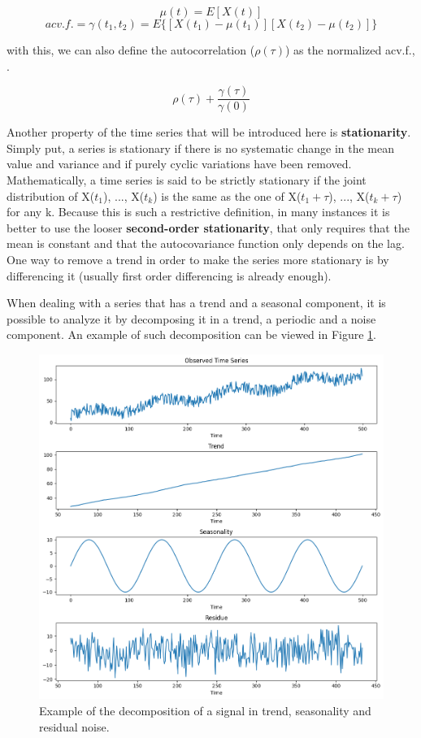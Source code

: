 \documentclass[../main.tex]{subfiles}
\begin{document}
            $$\mu(t) = E[X(t)]$$
            $$acv.f. = \gamma (t_1,t_2) = E\{[X(t_1)-\mu(t_1)][X(t_2)-\mu(t_2)]\}$$

        with this, we can also define the autocorrelation ($\rho(\tau)$) as the normalized acv.f., .

            $$\rho(\tau) + \frac{\gamma(\tau)}{\gamma (0)}$$

        Another property of the time series that will be introduced here is \textbf{stationarity}. Simply put, a series is stationary if there is no systematic change in the mean value and variance and if purely cyclic variations have been removed. Mathematically, a time series is said to be strictly stationary if the joint distribution of X($t_1$), ..., X($t_k$) is the same as the one of X($t_1+\tau$), ..., X($t_k+\tau$) for any k. Because this is such a restrictive definition, in many instances it is better to use the looser \textbf{second-order stationarity}, that only requires that the mean is constant and that the autocovariance function only depends on the lag. One way to remove a trend in order to make the series more stationary is by differencing it (usually first order differencing is already enough).

        When dealing with a series that has a trend and a seasonal component, it is possible to analyze it by decomposing it in a trend, a periodic and a noise component. An example of such decomposition can be viewed in Figure \ref{fig:decomposition}. \par

        \begin{figure}[h]
            \begin{center}
            \centering
            \includegraphics[width={0.8\columnwidth}]{images/trend_seas_res.png}
            \caption{Example of the decomposition of a signal in trend, seasonality and residual noise.}
            \label{fig:decomposition}
            \end{center}
        \end{figure}
\end{document}
